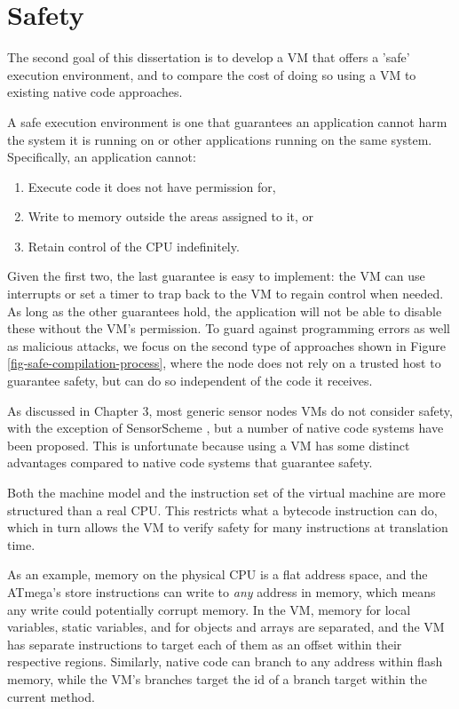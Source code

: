 \chapter{Safety}
\label{sec-safety}


The second goal of this dissertation is to develop a VM that offers a 'safe' execution environment, and to compare the cost of doing so using a VM to existing native code approaches.

A safe execution environment is one that guarantees an application cannot harm the system it is running on or other applications running on the same system. Specifically, an application cannot:
\begin{enumerate}
    \item Execute code it does not have permission for,
    \item Write to memory outside the areas assigned to it, or
    \item Retain control of the CPU indefinitely.
\end{enumerate}

Given the first two, the last guarantee is easy to implement: the VM can use interrupts or set a timer to trap back to the VM to regain control when needed. As long as the other guarantees hold, the application will not be able to disable these without the VM's permission. To guard against programming errors as well as malicious attacks, we focus on the second type of approaches shown in Figure \ref{fig-safe-compilation-process}, where the node does not rely on a trusted host to guarantee safety, but can do so independent of the code it receives.

As discussed in Chapter 3, most generic sensor nodes VMs do not consider safety, with the exception of SensorScheme \cite{Evers:2010ur}, but a number of native code systems have been proposed. This is unfortunate because using a VM has some distinct advantages compared to native code systems that guarantee safety.

Both the machine model and the instruction set of the virtual machine are more structured than a real CPU. This restricts what a bytecode instruction can do, which in turn allows the VM to verify safety for many instructions at translation time.

As an example, memory on the physical CPU is a flat address space, and the ATmega's store instructions can write to \emph{any} address in memory, which means any write could potentially corrupt memory. In the VM, memory for local variables, static variables, and for objects and arrays are separated, and the VM has separate instructions to target each of them as an offset within their respective regions. Similarly, native code can branch to any address within flash memory, while the VM's branches target the id of a branch target within the current method.

